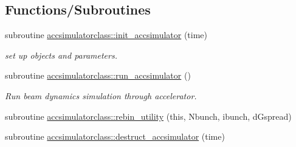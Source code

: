 \subsection*{Functions/\+Subroutines}
\begin{DoxyCompactItemize}
\item 
subroutine \mbox{\hyperlink{namespaceaccsimulatorclass_a6a90186281758191cfa3ef4fc9c54078}{accsimulatorclass\+::init\+\_\+accsimulator}} (time)
\begin{DoxyCompactList}\small\item\em set up objects and parameters. \end{DoxyCompactList}\item 
subroutine \mbox{\hyperlink{namespaceaccsimulatorclass_acbe26eeaf1cb4076384b90e1016785f0}{accsimulatorclass\+::run\+\_\+accsimulator}} ()
\begin{DoxyCompactList}\small\item\em Run beam dynamics simulation through accelerator. \end{DoxyCompactList}\item 
subroutine \mbox{\hyperlink{namespaceaccsimulatorclass_af2b7d5e3857ef686e1fb07f1d6abc800}{accsimulatorclass\+::rebin\+\_\+utility}} (this, Nbunch, ibunch, d\+Gspread)
\item 
subroutine \mbox{\hyperlink{namespaceaccsimulatorclass_a7bcc6275f447513b2ea5d85d46aade2a}{accsimulatorclass\+::destruct\+\_\+accsimulator}} (time)
\end{DoxyCompactItemize}
